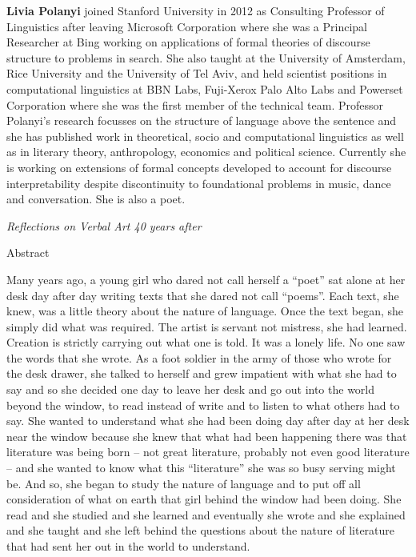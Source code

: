 {\bf Livia Polanyi} joined Stanford University in 2012 as Consulting Professor of Linguistics after leaving Microsoft Corporation where she was a Principal Researcher at Bing working on applications of formal theories of discourse structure to problems in search. She also taught at the University of Amsterdam, Rice University and the University of Tel Aviv, and held scientist positions in computational linguistics at BBN Labs, Fuji-Xerox Palo Alto Labs and Powerset Corporation where she was the first member of the technical team. Professor Polanyi's research focusses on the structure of language above the sentence and she has published work in theoretical, socio and computational linguistics as well as in literary theory, anthropology, economics and political science. Currently she is working on extensions of formal concepts developed to account for discourse interpretability despite discontinuity to foundational problems in music, dance and conversation. She is also a poet.    

\begin{center}
{\Large \em Reflections on Verbal Art 40 years after}
\end{center}

{\large Abstract}

Many years ago, a young girl who dared not call herself a “poet” sat alone at her desk day after day writing texts that she dared not call “poems”. Each text, she knew, was a little theory about the nature of language. Once the text began, she simply did what was required. The artist is servant not mistress, she had learned. Creation is strictly carrying out what one is told.  It was a lonely life. No one saw the words that she wrote.  As a foot soldier in the army of those who wrote for the desk drawer, she talked to herself and grew impatient with what she had to say and so she decided one day to leave her desk and go out into the world beyond the window, to read instead of write and to listen to what others had to say. She wanted to understand what she had been doing day after day at her desk near the window because she knew that what had been happening there was that literature was being born -- not great literature, probably not even good literature – and she wanted to know what this “literature” she was so busy serving might be. And so, she began to study the nature of language and to put off all consideration of what on earth that girl behind the window had been doing. She read and she studied and she learned and eventually she wrote and she explained and she taught and she left behind the questions about the nature of literature that had sent her out in the world to understand.

